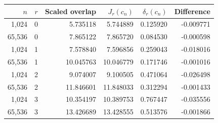 \begin{tabular}{rrrrrr}
\toprule
$n$ & $r$ & Scaled overlap & $J_r(c_n)$ & $\delta_r(c_n)$ & Difference\\
\midrule
1,024 & 0 & 5.735118 & 5.744889 & 0.125920 & -0.009771 \\
65,536 & 0 & 7.865122 & 7.865720 & 0.084530 & -0.000598 \\
1,024 & 1 & 7.578840 & 7.596856 & 0.259043 & -0.018016 \\
65,536 & 1 & 10.045763 & 10.046779 & 0.171746 & -0.001016 \\
1,024 & 2 & 9.074007 & 9.100505 & 0.471064 & -0.026498 \\
65,536 & 2 & 11.846601 & 11.848033 & 0.312294 & -0.001433 \\
1,024 & 3 & 10.354197 & 10.389753 & 0.767447 & -0.035556 \\
65,536 & 3 & 13.426689 & 13.428555 & 0.513576 & -0.001866 \\
\bottomrule
\end{tabular}
